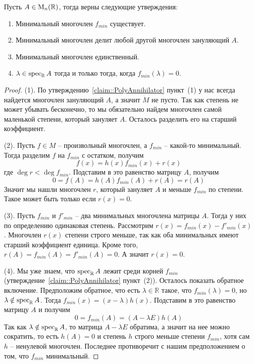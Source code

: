 \begin{claim}
\label{claim::MinPoly}
Пусть $A\in \operatorname{M}_{n}(\mathbb R)$, тогда верны следующие утверждения:
\begin{enumerate}
\item Минимальный многочлен $f_{min}$ существует.

\item Минимальный многочлен делит любой другой многочлен зануляющий $A$.

\item Минимальный многочлен единственный.

\item $\lambda\in\operatorname{spec}_\mathbb R A$ тогда и только тогда, когда $f_{min}(\lambda) = 0$.
\end{enumerate}
\end{claim}
\begin{proof}
(1).
По утверждению~\ref{claim::PolyAnnihilator} пункт~(1) у нас всегда найдется многочлен зануляющий $A$, а значит $M$ не пусто.
Так как степень не может убывать бесконечно, то мы обязательно найдем многочлен самой маленькой степени, который зануляет $A$.
Осталось разделить его на старший коэффициент.

(2).
Пусть $f\in M$ -- произвольный многочлен, а $f_{min}$ -- какой-то минимальный.
Тогда разделим $f$ на $f_{min}$ с остатком, получим 
\[
f(x) = h(x)f_{min}(x) + r(x)
\]
где $\deg r < \deg f_{min}$.
Подставим в это равенство матрицу $A$, получим
\[
0 = f(A) = h(A)f_{min}(A) + r(A) = r(A)
\]
Значит мы нашли многочлен $r$, который зануляет $A$ и меньше $f_{min}$ по степени.
Такое может быть только если $r(x) = 0$.

(3).
Пусть $f_{min}$ и $f'_{min}$ -- два минимальных многочлена матрицы $A$.
Тогда у них по определению одинаковая степень.
Рассмотрим $r(x) = f_{min}(x) - f'_{min}(x)$.
Многочлен $r(x)$ степени строго меньше, так как оба минимальных имеют старший коэффициент единица.
Кроме того, $r(A) = f_{min }(A) = f'_{min}(A) = 0$.
А значит $r(x) = 0$.

(4).
Мы уже знаем, что $\operatorname{spec}_\mathbb RA$ лежит среди корней $f_{min}$ (утверждение~\ref{claim::PolyAnnihilator} пункт~(2)).
Осталось показать обратное включение.
Предположим обратное, что есть $\lambda\in \mathbb R$ такое, что $f_{min}(\lambda) = 0$, но $\lambda\notin\operatorname{spec}_\mathbb RA$.
Тогда $f_{min}(x) = (x-\lambda)h(x)$.
Подставим в это равенство матрицу $A$ и получим 
\[
0 = f_{min}(A) = (A - \lambda E)h(A)
\]
Так как $\lambda\notin\operatorname{spec}_\mathbb R A$, то матрица $A-\lambda E$ обратима, а значит на нее можно сократить, то есть $h(A) = 0$ и степень $h$ строго меньше степени $f_{min}$, хотя сам $h$ -- ненулевой многочлен.
Последнее противоречит с нашим предположением о том, что $f_{min}$ минимальный.
\end{proof}


